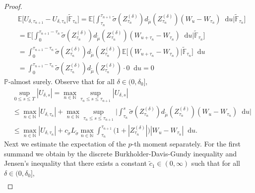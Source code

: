 \documentclass[10pt,a4paper]{amsart}
\newcommand{\E}{{\mathbb{E}}}
\newcommand{\N}{{\mathbb{N}}}
\renewcommand{\P}{{\mathbb{P}}}
\newcommand{\diff}{\mathop{}\!\mathrm{d}}
\begin{document}
\begin{proof}
    \begin{equation}\label{M19}
        \begin{aligned}
        &\E\Big[ U_{\delta,\tau_{n+1}} - U_{\delta,\tau_{n}}  \Big|\widetilde{\mathbb{F}}_{\tau_n} \Big]
        = \E\Big[ \int_{\tau_n}^{\tau_{n+1}} \widetilde\sigma(Z^{(\delta)}_{\tau_n}) d_{\widetilde\mu}(Z^{(\delta)}_{\tau_n}) (W_u-W_{\tau_n}) \diff u \Big|\widetilde{\mathbb{F}}_{\tau_n} \Big] \\
        &= \E\Big[ \int_{0}^{\tau_{n+1}-\tau_n} \widetilde\sigma(Z^{(\delta)}_{\tau_n}) d_{\widetilde\mu}(Z^{(\delta)}_{\tau_n}) (W_{u+\tau_n}-W_{\tau_n}) \diff u \Big|\widetilde{\mathbb{F}}_{\tau_n} \Big] \\
        &= \int_{0}^{\tau_{n+1}-\tau_n} \widetilde\sigma(Z^{(\delta)}_{\tau_n}) d_{\widetilde\mu}(Z^{(\delta)}_{\tau_n})  \E\Big[ (W_{u+\tau_n}-W_{\tau_n})  \Big|\widetilde{\mathbb{F}}_{\tau_n} \Big] \diff u \\
        &= \int_{0}^{\tau_{n+1}-\tau_n} \widetilde\sigma(Z^{(\delta)}_{\tau_n}) d_{\widetilde\mu}(Z^{(\delta)}_{\tau_n})  \cdot 0 \diff u = 0
        \end{aligned}
    \end{equation}
    $\P$-almost surely.
    Observe that for all $\delta\in(0,\delta_0]$,
    \begin{equation}\label{M25}
        \begin{aligned}
        &\sup_{0\leq s\leq T} |U_{\delta,s}| = \max_{n\in\N} \sup_{\tau_n\leq s \leq \tau_{n+1}} |U_{\delta,s}| \\
        &\leq \max_{n\in\N} |U_{\delta,\tau_n}| + \max_{n\in\N} \sup_{\tau_n\leq s \leq \tau_{n+1}} \Big| \int_{\tau_n}^s \widetilde\sigma(Z^{(\delta)}_{\tau_n}) d_{\widetilde\mu}(Z^{(\delta)}_{\tau_n}) (W_u-W_{\tau_n}) \diff u \Big| \\
        &\leq \max_{n\in\N} |U_{\delta,\tau_n}| + c_{\widetilde\sigma} L_{\widetilde\sigma} \max_{n\in\N} \int_{\tau_n}^{\tau_{n+1}} \big( 1 +  |Z^{(\delta)}_{\tau_n}|\big)|W_u-W_{\tau_n}| \diff u.
        \end{aligned}
    \end{equation}
    Next we estimate the expectation of the $p$-th moment separately. For the first summand we obtain by the discrete Burkholder-Davis-Gundy inequality and Jensen's inequality that there exists a constant $\widetilde c_1\in(0,\infty)$ such that for all $\delta\in(0,\delta_0]$,
    \begin{equation}\label{M27}
        \begin{aligned}

\end{aligned}
\end{equation}
\end{proof}
\end{document}
